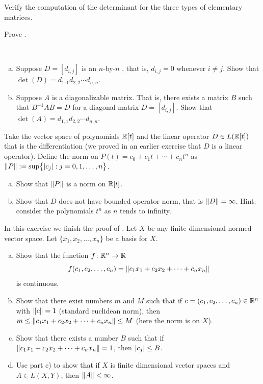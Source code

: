 \begin{exercise}
Verify the computation of the determinant for the three types of 
elementary matrices.
\end{exercise}

\begin{exercise}
Prove .
\end{exercise}

\begin{exercise}
{\ }
\begin{enumerate}[a)]
\item
Suppose $D = [d_{i,j}]$ is an $n$-by-$n$ \emph{}, that is, $d_{i,j} = 0$ whenever $i
\not= j$.  Show that $\det(D) = d_{1,1}d_{2,2} \cdots d_{n,n}$.
\item
Suppose $A$ is a diagonalizable matrix.  That is, there exists a matrix
$B$ such that $B^{-1}AB = D$ for a diagonal matrix $D = [d_{i,j}]$.  Show
that $\det(A) = d_{1,1}d_{2,2} \cdots d_{n,n}$.
\end{enumerate}
\end{exercise}

\begin{exercise}
Take the vector space of polynomials ${\mathbb{R}}[t]$ and the linear operator $D \in
L({\mathbb{R}}[t])$ that is
the differentiation (we proved in an earlier exercise that $D$ is a linear
operator).  Define the norm on $P(t) = c_0 + c_1 t + \cdots + c_n
t^n$ as $\lVert {P} \rVert := \sup \bigl\{ \lvert {c_j} \rvert : j = 0,1,\ldots,n \bigr\}$.
\begin{enumerate}[a)]
\item
Show that $\lVert {P} \rVert$ is a norm on ${\mathbb{R}}[t]$.
\item
Show that $D$ does not have bounded operator norm, that is $\lVert {D} \rVert =
\infty$.  Hint: consider the polynomials $t^n$ as $n$ tends to infinity.
\end{enumerate}
\end{exercise}

\begin{exercise}
In this exercise we finish the proof of .
Let $X$ be any finite dimensional normed vector space.
Let $\{ x_1,x_2,\ldots,x_n \}$ be a basis for $X$.
\begin{enumerate}[a)]
\item
Show that the function $f \colon {\mathbb{R}}^n \to {\mathbb{R}}$
\begin{equation*}
f(c_1,c_2,\ldots,c_n) = 
\lVert {c_1 x_1 + c_2 x_2 + \cdots + c_n x_n} \rVert
\end{equation*}
is continuous.
\item
Show that there exist numbers $m$ and $M$ such
that if $c = (c_1,c_2,\ldots,c_n) \in {\mathbb{R}}^n$ with
$\lVert {c} \rVert = 1$ (standard euclidean norm), then 
$m \leq \lVert {c_1 x_1 + c_2 x_2 + \cdots + c_n x_n} \rVert \leq M$ (here the
norm is on $X$).
\item
Show that there exists a number $B$ such that if
$\lVert {c_1 x_1 + c_2 x_2 + \cdots + c_n x_n} \rVert=1$,
then $\lvert {c_j} \rvert \leq B$.
\item
Use part c) to show that if $X$ is finite dimensional vector 
spaces and $A \in L(X,Y)$, then $\lVert {A} \rVert < \infty$.
\end{enumerate}
\end{exercise}


